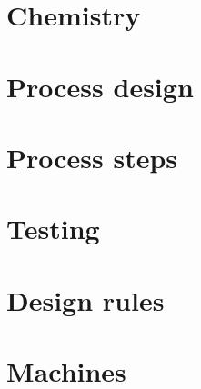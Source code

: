 \documentclass[10pt,a4paper,oneside]{article}
\newcounter{ct}
\begin{document}
\section{Chemistry}


\newpage
\section{Process design}

\newpage




\newpage

\newpage

\newpage

\newpage

\newpage

\newpage

\newpage
\section{Process steps}
\label{process_overview}
\newpage

\newpage

\newpage

\newpage

\newpage

\newpage

\newpage

\newpage

\newpage

\newpage

\newpage

\newpage
\section{Testing}

\newpage

\newpage

\newpage
\section{Design rules}


\newpage
\section{Machines}



\newpage
\listoffootnotes \cleardoublepage
\end{document}

